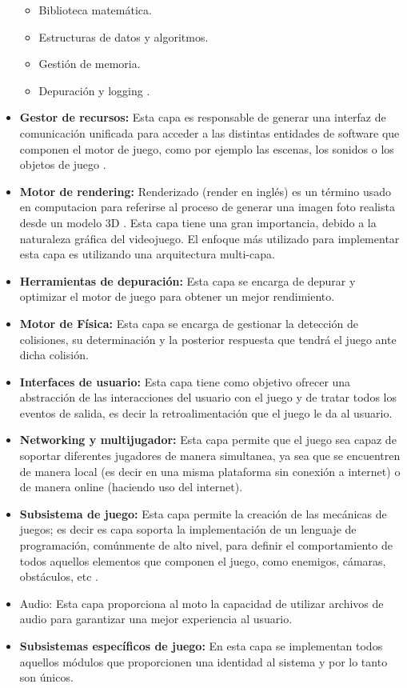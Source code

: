 \begin{itemize}
 	\begin{itemize}
 		\item Biblioteca matemática.
 		\item Estructuras de datos y algoritmos.
 		\item Gestión de memoria.
 		\item Depuración y logging \cite{Ref:ArquMotor}.
 	\end{itemize}
 	\item \textbf{Gestor de recursos:} Esta capa es responsable de generar una interfaz de comunicación unificada para acceder a las distintas entidades de software que componen el motor de juego, como por ejemplo las escenas, los sonidos o los objetos de juego \cite{Ref:ArquMotor}.
 	\item \textbf{Motor de rendering:} Renderizado (render en inglés) es un término usado en computacion para referirse al proceso de generar una imagen foto realista desde un modelo 3D \cite{Ref:Render}. Esta capa tiene una gran importancia, debido a la naturaleza gráfica del videojuego. El enfoque más utilizado para implementar esta capa es utilizando una arquitectura multi-capa\cite{Ref:ArquMotor}.
 	\item \textbf{Herramientas de depuración:} Esta capa se encarga de depurar y optimizar el motor de juego para obtener un mejor rendimiento\cite{Ref:ArquMotor}.
 	\item \textbf{Motor de Física:} Esta capa se encarga de gestionar la detección de colisiones, su determinación y la posterior respuesta que tendrá el juego ante dicha colisión.
 	\item \textbf{Interfaces de usuario:} Esta capa tiene como objetivo ofrecer una abstracción de las interacciones del usuario con el juego y de tratar todos los eventos de salida, es decir la retroalimentación que el juego le da al usuario\cite{Ref:ArquMotor}.
 	\item \textbf{Networking y multijugador:} Esta capa permite que el juego sea capaz de soportar diferentes jugadores de manera simultanea, ya sea que se encuentren de manera local (es decir en una misma plataforma sin conexión a internet) o de manera online (haciendo uso del internet)\cite{Ref:ArquMotor}.
 	\item \textbf{Subsistema de juego:} Esta capa permite la creación de las mecánicas de juegos; es decir es capa soporta la implementación de un lenguaje de programación, comúnmente de alto nivel, para definir el comportamiento de todos aquellos elementos que componen el juego, como enemigos, cámaras, obstáculos, etc \cite{Ref:ArquMotor}.
 	\item Audio: Esta capa proporciona al moto la capacidad de utilizar archivos de audio para garantizar una mejor experiencia al usuario\cite{Ref:ArquMotor}.
 	\item \textbf{Subsistemas específicos de juego:} En esta capa se implementan todos aquellos módulos que proporcionen una identidad al sistema y por lo tanto son únicos\cite{Ref:ArquMotor}.
 \end{itemize}